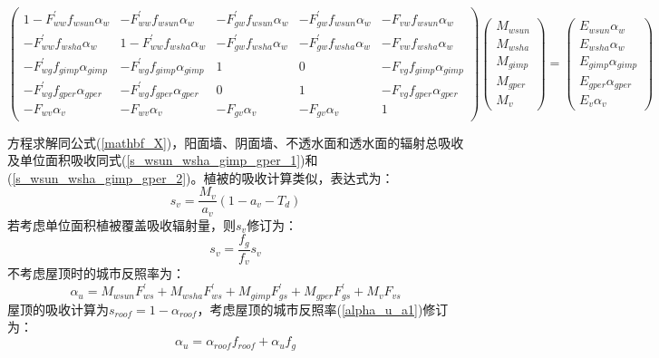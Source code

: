 \begin{landscape}
\begin{equation}
\left(\begin{array}{ccccc}1-F_{ww}^{\prime} f_{wsun} \alpha_{w} & -F_{ww}^{\prime} f_{wsun} \alpha_{w} & -F_{g w}^{\prime} f_{wsun} \alpha_{w} & -F_{g w}^{\prime} f_{wsun} \alpha_{w} & -F_{v w} f_{wsun} \alpha_{w} \\ -F_{ww}^{\prime} f_{wsha} \alpha_{w} & 1-F_{ww}^{\prime} f_{wsha} \alpha_{w} & -F_{g w}^{\prime} f_{wsha} \alpha_{w} & -F_{g w}^{\prime} f_{wsha} \alpha_{w} & -F_{v w} f_{wsha} \alpha_{w} \\ -F_{w g}^{\prime} f_{gimp} \alpha_{gimp} & -F_{w g}^{\prime} f_{gimp} \alpha_{gimp} & 1 & 0 & -F_{v g} f_{gimp} \alpha_{gimp} \\ -F_{w g}^{\prime} f_{gper} \alpha_{gper} & -F_{w g}^{\prime} f_{gper} \alpha_{gper} & 0 & 1 & -F_{v g} f_{gper} \alpha_{gper} \\ -F_{w v} \alpha_{v} & -F_{w v} \alpha_{v} & -F_{g v} \alpha_{v} & -F_{g v} \alpha_{v} & 1\end{array}\right)\left(\begin{array}{c}M_{wsun} \\ M_{wsha} \\ M_{gimp} \\ M_{gper} \\ M_{v}\end{array}\right)=\left(\begin{array}{c}E_{wsun} \alpha_{w} \\ E_{wsha} \alpha_{w} \\ E_{gimp} \alpha_{gimp} \\ E_{gper} \alpha_{gper} \\ E_{v} \alpha_{v}\end{array}\right)
\end{equation}
\end{landscape}
方程求解同公式(\ref{mathbf_X})，阳面墙、阴面墙、不透水面和透水面的辐射总吸收及单位面积吸收同式(\ref{s_wsun_wsha_gimp_gper_1})和(\ref{s_wsun_wsha_gimp_gper_2})。植被的吸收计算类似，表达式为：
\begin{equation}
s_{v}=\frac{M_{v}}{a_{v}}\left(1-a_{v}-T_{d}\right)
\end{equation}
若考虑单位面积植被覆盖吸收辐射量，则$s_v$修订为：
\begin{equation}
s_{v}=\frac{f_{g}}{f_{v}} s_{v}
\end{equation}
不考虑屋顶时的城市反照率为：
\begin{equation}\label{alpha_u_a1}
\alpha_{u}=M_{wsun} F_{ws}^{\prime}+M_{wsha} F_{ws}^{\prime}+M_{gimp} F_{gs}^{\prime}+M_{gper} F_{gs}^{\prime}+M_{v} F_{v s}
\end{equation}
屋顶的吸收计算为$s_{roof}=1-\alpha_{roof}$，考虑屋顶的城市反照率(\ref{alpha_u_a1})修订为：
\begin{equation}
\alpha_{u}=\alpha_{roof} f_{roof}+\alpha_{u} f_{g}
\end{equation}


